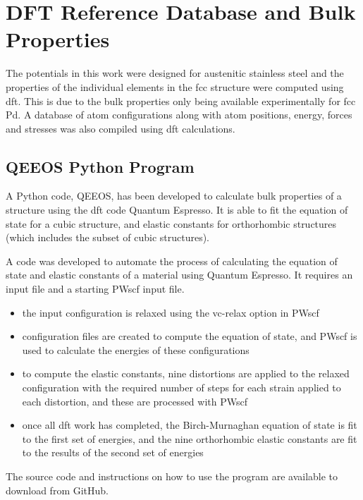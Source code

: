 \FloatBarrier
\section[DFT Results]{DFT Reference Database and Bulk Properties}
\label{section:dftrefdb}

The potentials in this work were designed for austenitic stainless steel and the properties of the individual elements in the \acrshort{fcc} structure were computed using \acrshort{dft}.  This is due to the bulk properties only being available experimentally for \acrshort{fcc} \Gls{Pd}.  A database of atom configurations along with atom positions, energy, forces and stresses was also compiled using \acrshort{dft} calculations.


\subsection{QEEOS Python Program}
\label{section:qeeospyprog}

A Python code, QEEOS, has been developed to calculate bulk properties of a structure using the \acrshort{dft} code Quantum Espresso.  It is able to fit the equation of state for a cubic structure, and elastic constants for orthorhombic structures (which includes the subset of cubic structures).  

A code was developed to automate the process of calculating the equation of state and elastic constants of a material using Quantum Espresso.  It requires an input file and a starting PWscf input file.  

\begin{itemize}
\item the input configuration is relaxed using the vc-relax option in PWscf
\item configuration files are created to compute the equation of state, and PWscf is used to calculate the energies of these configurations
\item to compute the elastic constants, nine distortions are applied to the relaxed configuration with the required number of steps for each strain applied to each distortion, and these are processed with PWscf
\item once all \acrshort{dft} work has completed, the Birch-Murnaghan equation of state is fit to the first set of energies, and the nine orthorhombic elastic constants are fit to the results of the second set of energies
\end{itemize}

The source code and instructions on how to use the program are available to download from GitHub.

